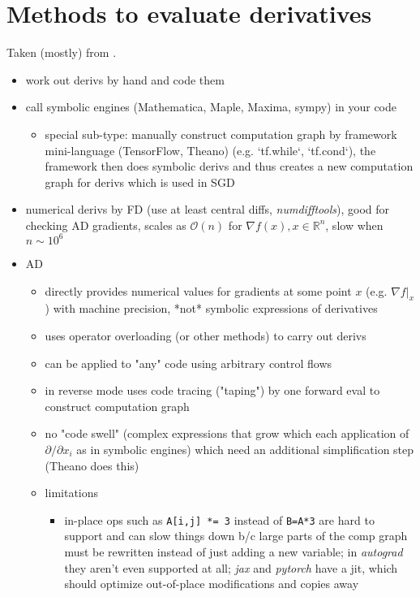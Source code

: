 \documentclass[paper=a4,11pt,headsepline]{scrartcl}
\newcommand{\ve}[1]{\ensuremath{\bm{\mathit{#1}}}}
\begin{document}
\section{Methods to evaluate derivatives}
%
Taken (mostly) from \cite{baydin_2018}.

\begin{itemize}
    \item work out derivs by hand and code them
    \item call symbolic engines (Mathematica, Maple, Maxima, sympy) in your code
    \begin{itemize}
        \item special sub-type: manually construct computation graph by
            framework mini-language (TensorFlow, Theano) (e.g. `tf.while`,
            `tf.cond`), the framework then does symbolic derivs and thus
            creates a new computation graph for derivs which is used in SGD
    \end{itemize}
\item numerical derivs by FD (use at least central diffs,
    \textsl{numdifftools}), good for checking AD gradients, scales as $\mathcal
    O(n)$ for $\nabla f(\ve x), \ve x\in\mathbb R^n$, slow when $n\sim 10^6$
\item AD
    \begin{itemize}
        \item directly provides numerical values for gradients at some point
            $\ve x$ (e.g. $\nabla f|_{\ve x}$) with machine precision, *not*
            symbolic expressions of derivatives
        \item uses operator overloading (or other methods) to carry out derivs
        \item can be applied to "any" code using arbitrary control flows
        \item in reverse mode uses code tracing ("taping") by one forward eval
            to construct computation graph
        \item no "code swell" (complex expressions that grow which each
            application of $\partial/\partial x_i$ as in symbolic engines)
            which need an additional simplification step (Theano does this)
        \item limitations
        \begin{itemize}
            \item in-place ops such as \texttt{A[i,j] *= 3} instead of
                \texttt{B=A*3} are hard to support and can slow things down b/c
                large parts of the comp graph must be rewritten instead of just
                adding a new variable; in \textsl{autograd} they aren't even
                supported at all; \textsl{jax} and \textsl{pytorch} have a jit,
                which should optimize out-of-place modifications and copies
                away
        \end{itemize}
    \end{itemize}
\end{itemize}
%
\end{document}
